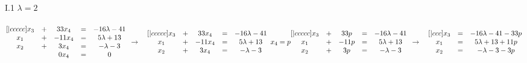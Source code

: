 \documentclass{article}
\begin{document}
    \\
    \\
    I.1 \(\lambda = 2\)\\
    \\
    \begin{math}
       \begin{matrix}[|ccccc]
            x_3 & + & 33x_4 & = & -16\lambda - 41\\
            x_1 & + & -11x_4 & = & 5\lambda + 13\\
            x_2 & + & 3x_4 & = & -\lambda - 3\\
            ~ & ~ & 0x_4 & = & 0\\
        \end{matrix}\\
        \\
        \\
        \to\quad
        \begin{matrix}[|ccccc]
            x_3 & + & 33x_4 & = & -16\lambda - 41\\
            x_1 & + & -11x_4 & = & 5\lambda + 13\\
            x_2 & + & 3x_4 & = & -\lambda - 3\\
        \end{matrix}\\
        \\
        x_4 = p\\
        \\
        \begin{matrix}[|ccccc]
            x_3 & + & 33p & = & -16\lambda - 41\\
            x_1 & + & -11p & = & 5\lambda + 13\\
            x_2 & + & 3p & = & -\lambda - 3\\
        \end{matrix}\\
        \\
        \\
        \to\quad
        \begin{matrix}[|ccc]
            x_3 & = & -16\lambda - 41 - 33p\\
            x_1 & = & 5\lambda + 13 + 11p\\
            x_2 & = & -\lambda - 3 - 3p\\
        \end{matrix}
    \end{math}\\
    \\
    \\
\end{document}
